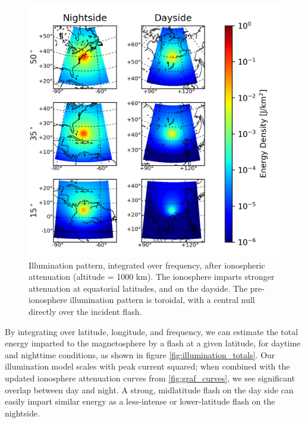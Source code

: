 \begin{figure}[h!]
\begin{center}
\includegraphics{figures/illumination_basemap.png}
\caption[Illumination pattern above the ionosphere]{Illumination pattern, integrated over frequency, after ionospheric attenuation (altitude = 1000 km). The ionosphere imparts stronger attenuation at equatorial latitudes, and on the dayside. The pre-ionosphere illumination pattern is toroidal, with a central null directly over the incident flash.}
\label{fig:illumination}
\end{center}
\end{figure}

By integrating over latitude, longitude, and frequency, we can estimate the total energy imparted to the magnetosphere by a flash at a given latitude, for daytime and nighttime conditions, as shown in figure \ref{fig:illumination_totals}. Our illumination model scales with peak current squared; when combined with the updated ionosphere attenuation curves from \ref{fig:graf_curves}, we see significant overlap between day and night. A strong, midlatitude flash on the day side can easily impart similar energy as a less-intense or lower-latitude flash on the nightside.

